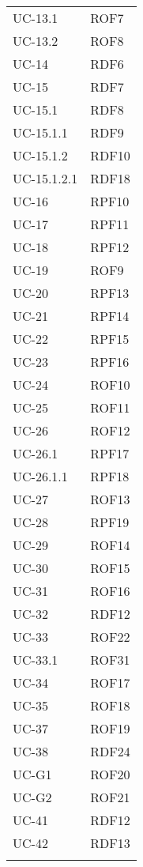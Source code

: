 \begin{longtable}{| p{5cm} | p{5cm} |}
		UC-13.1 & ROF7 \\
		UC-13.2 & ROF8 \\
		\rowcolor{LightGray}
		UC-14 & RDF6\\
		UC-15 & RDF7 \\
		\rowcolor{LightGray}
		UC-15.1 & RDF8\\
		UC-15.1.1 & RDF9\\
		\rowcolor{LightGray}
		UC-15.1.2 & RDF10\\
		UC-15.1.2.1 & RDF18\\
		\rowcolor{LightGray}
		UC-16 & RPF10\\
		UC-17 & RPF11\\
		\rowcolor{LightGray}
		UC-18 & RPF12 \\
		UC-19 & ROF9 \\
		\rowcolor{LightGray}
		UC-20 & RPF13 \\
		UC-21 & RPF14 \\
		\rowcolor{LightGray}
		UC-22 & RPF15 \\ 
		UC-23 & RPF16\\
		\rowcolor{LightGray}
		UC-24 & ROF10 \\
		UC-25 & ROF11 \\
		\rowcolor{LightGray}
		UC-26 & ROF12 \\
		UC-26.1 & RPF17 \\
		\rowcolor{LightGray}
		UC-26.1.1 & RPF18\\
		UC-27 & ROF13 \\
		\rowcolor{LightGray}
		UC-28 & RPF19 \\
		UC-29 & ROF14 \\
		\rowcolor{LightGray}
		UC-30 & ROF15 \\
		UC-31 & ROF16 \\
		\rowcolor{LightGray}
		UC-32 & RDF12\\
		UC-33 & ROF22\\
		\rowcolor{LightGray}
		UC-33.1 & ROF31\\
		UC-34 & ROF17\\
		\rowcolor{LightGray}
		UC-35 & ROF18\\
		\rowcolor{LightGray}
		UC-37 & ROF19\\
		UC-38 & RDF24\\
		\rowcolor{LightGray}
		UC-G1 & ROF20\\
		UC-G2 & ROF21\\
		\rowcolor{LightGray}
		UC-41 & RDF12\\
		UC-42 & RDF13\\
		\rowcolor{LightGray}

\end{longtable}
